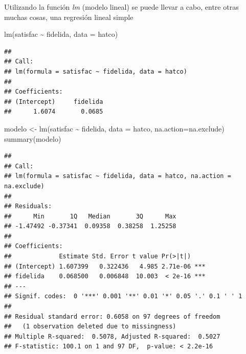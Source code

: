 \documentclass[
]{book}
\newenvironment{Shaded}{\begin{snugshade}}{\end{snugshade}}
\newcommand{\AttributeTok}[1]{\textcolor[rgb]{0.77,0.63,0.00}{#1}}
\newcommand{\CommentTok}[1]{\textcolor[rgb]{0.56,0.35,0.01}{\textit{#1}}}
\newcommand{\FunctionTok}[1]{\textcolor[rgb]{0.00,0.00,0.00}{#1}}
\newcommand{\NormalTok}[1]{#1}
\newcommand{\OtherTok}[1]{\textcolor[rgb]{0.56,0.35,0.01}{#1}}
\newcommand{\SpecialCharTok}[1]{\textcolor[rgb]{0.00,0.00,0.00}{#1}}
\theoremstyle{break}
\begin{document}
Utilizando la función \emph{lm} (modelo lineal) se puede llevar a cabo, entre otras
muchas cosas, una regresión lineal simple

\begin{Shaded}
\begin{Highlighting}[]
\FunctionTok{lm}\NormalTok{(satisfac }\SpecialCharTok{\textasciitilde{}}\NormalTok{ fidelida, }\AttributeTok{data =}\NormalTok{ hatco)}
\end{Highlighting}
\end{Shaded}

\begin{verbatim}
## 
## Call:
## lm(formula = satisfac ~ fidelida, data = hatco)
## 
## Coefficients:
## (Intercept)     fidelida  
##      1.6074       0.0685
\end{verbatim}

\begin{Shaded}
\begin{Highlighting}[]
\NormalTok{modelo }\OtherTok{\textless{}{-}} \FunctionTok{lm}\NormalTok{(satisfac }\SpecialCharTok{\textasciitilde{}}\NormalTok{ fidelida, }\AttributeTok{data =}\NormalTok{ hatco, }\AttributeTok{na.action=}\NormalTok{na.exclude)}
\FunctionTok{summary}\NormalTok{(modelo)}
\end{Highlighting}
\end{Shaded}

\begin{verbatim}
## 
## Call:
## lm(formula = satisfac ~ fidelida, data = hatco, na.action = na.exclude)
## 
## Residuals:
##      Min       1Q   Median       3Q      Max 
## -1.47492 -0.37341  0.09358  0.38258  1.25258 
## 
## Coefficients:
##             Estimate Std. Error t value Pr(>|t|)    
## (Intercept) 1.607399   0.322436   4.985 2.71e-06 ***
## fidelida    0.068500   0.006848  10.003  < 2e-16 ***
## ---
## Signif. codes:  0 '***' 0.001 '**' 0.01 '*' 0.05 '.' 0.1 ' ' 1
## 
## Residual standard error: 0.6058 on 97 degrees of freedom
##   (1 observation deleted due to missingness)
## Multiple R-squared:  0.5078, Adjusted R-squared:  0.5027 
## F-statistic: 100.1 on 1 and 97 DF,  p-value: < 2.2e-16
\end{verbatim}

\begin{Shaded}
\end{Shaded}
\end{document}
